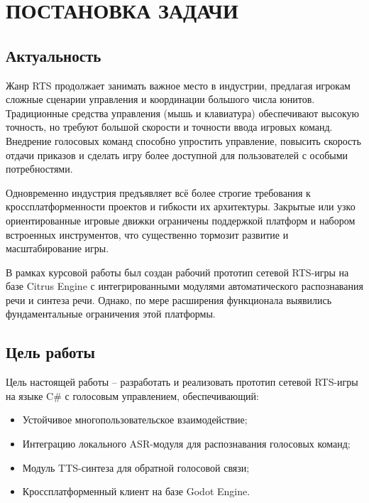 \section{ПОСТАНОВКА ЗАДАЧИ}

    \subsection{Актуальность} 
    Жанр RTS продолжает занимать важное место в индустрии, предлагая игрокам сложные сценарии управления и координации большого числа юнитов. Традиционные средства управления (мышь и клавиатура) обеспечивают высокую точность, но требуют большой скорости и точности ввода игровых команд. Внедрение голосовых команд способно упростить управление, повысить скорость отдачи приказов и сделать игру более доступной для пользователей с особыми потребностями.

    Одновременно индустрия предъявляет всё более строгие требования к кроссплатформенности проектов и гибкости их архитектуры. Закрытые или узко ориентированные игровые движки ограничены поддержкой платформ и набором встроенных инструментов, что существенно тормозит развитие и масштабирование игры.

    В рамках курсовой работы был создан рабочий прототип сетевой RTS-игры на базе Citrus Engine с интегрированными модулями автоматического распознавания речи и синтеза речи. Однако, по мере расширения функционала выявились фундаментальные ограничения этой платформы.

    \subsection{Цель работы}
    Цель настоящей работы -- разработать и реализовать прототип сетевой RTS-игры на языке C\# с голосовым управлением, обеспечивающий:
    \begin{itemize}
        \item Устойчивое многопользовательское взаимодействие;
        \item Интеграцию локального ASR-модуля для распознавания голосовых команд;
        \item Модуль TTS-синтеза для обратной голосовой связи;
        \item Кроссплатформенный клиент на базе Godot Engine.
    \end{itemize}



